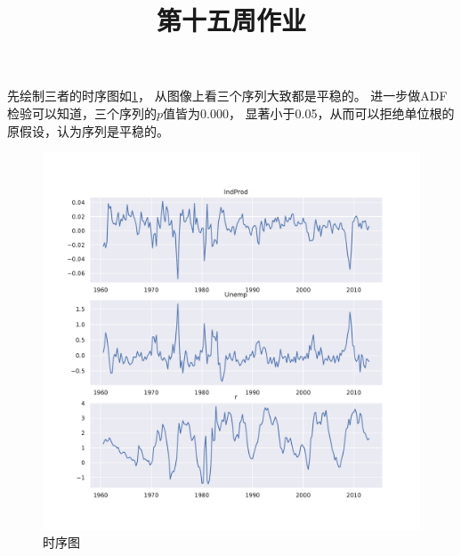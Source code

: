 \documentclass[cn]{homework}
\title{第十五周作业}
\begin{document}
    \maketitle

    \problem
    先绘制三者的时序图如\cref{fig:trend}，
    从图像上看三个序列大致都是平稳的。
    进一步做ADF检验可以知道，三个序列的$p$值皆为0.000，
    显著小于0.05，从而可以拒绝单位根的原假设，认为序列是平稳的。

    \begin{figure}[h]
        \centering
        \includegraphics[width=\textwidth]{trend}
        \caption{时序图}
        \label{fig:trend}
    \end{figure}
\end{document}

